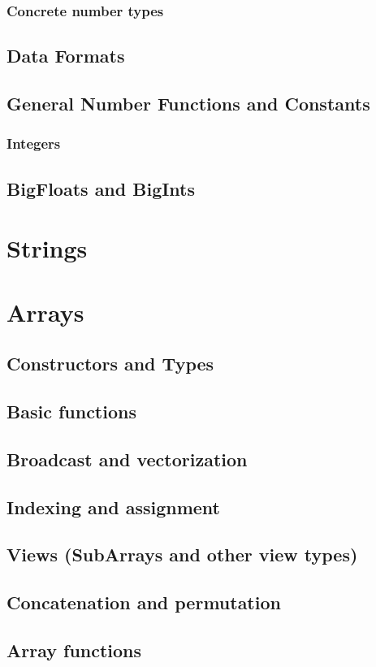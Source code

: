     \subsection{Concrete number types}
    \section{Data Formats}
    \section{General Number Functions and Constants}
    \subsection{Integers}
    \section{BigFloats and BigInts}
\chapter{Strings}
\chapter{Arrays}
    \section{Constructors and Types}
    \section{Basic functions}
    \section{Broadcast and vectorization}
    \section{Indexing and assignment}
    \section{Views (SubArrays and other view types)}
    \section{Concatenation and permutation}
    \section{Array functions}
